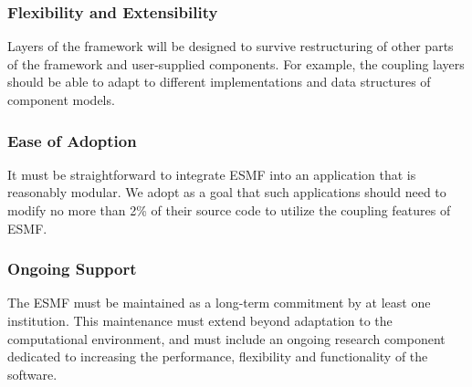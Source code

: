 \subsubsection{Flexibility and Extensibility}

Layers of the framework will be designed to survive restructuring of
other parts of the framework and user-supplied components.  For example,
the coupling layers should be able to adapt to different implementations
and data structures of component models.

\subsubsection{Ease of Adoption}

It must be straightforward to integrate ESMF into an application that
is reasonably modular.  We adopt as a goal that such applications should
need to modify no more than 2\% of their source code to utilize the coupling
features of ESMF.

\subsubsection{Ongoing Support}

The ESMF must be maintained as a long-term commitment by at least one
institution.  This maintenance must extend beyond adaptation to the 
computational environment, and must include an ongoing research component
dedicated to increasing the performance, flexibility and functionality of
the software.










